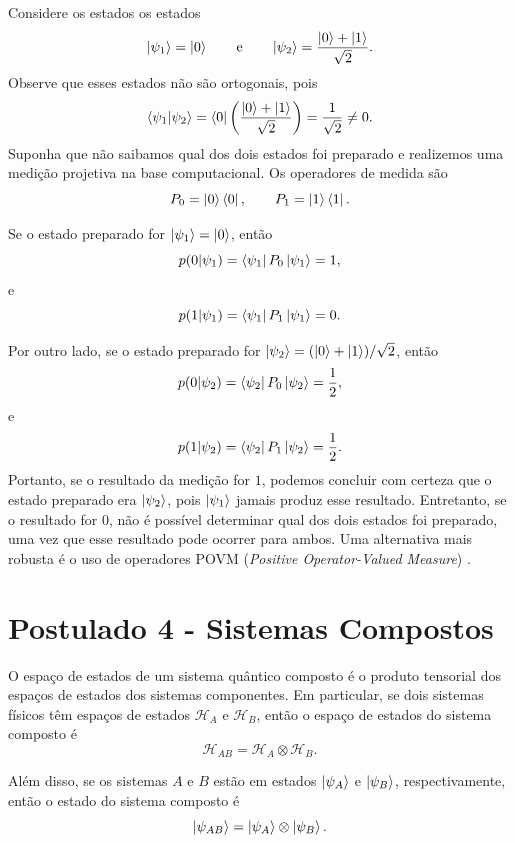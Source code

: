 \begin{example}\label{ex:nproj}
Considere os estados os estados
$$
    \ket{\psi_1}=\ket{0}
    \qquad\text{e}\qquad
    \ket{\psi_2}=\frac{\ket{0}+\ket{1}}{\sqrt{2}}.
$$
Observe que esses estados não são ortogonais, pois
$$
    \braket{\psi_1|\psi_2}
    =
    \bra{0}
    \left(
        \frac{\ket{0}+\ket{1}}{\sqrt{2}}
    \right)
    =
    \frac{1}{\sqrt{2}}
    \neq 0.
$$
Suponha que não saibamos qual dos dois estados foi preparado e
realizemos uma medição projetiva na base computacional. Os operadores
de medida são
$$
    P_0=\ket{0}\bra{0},
    \qquad
    P_1=\ket{1}\bra{1}.
$$

Se o estado preparado for $\ket{\psi_1}=\ket{0}$, então
$$
    p(0|\psi_1)
    =
    \bra{\psi_1}P_0\ket{\psi_1}
    =1,
$$
e
$$
    p(1|\psi_1)
    =
    \bra{\psi_1}P_1\ket{\psi_1}
    =0.
$$

Por outro lado, se o estado preparado for $\ket{\psi_2}=(\ket{0}+\ket{1})/\sqrt{2}$, então
$$
    p(0|\psi_2)
    =
    \bra{\psi_2}P_0\ket{\psi_2}
    =
    \frac{1}{2},
$$
e
$$
    p(1|\psi_2)
    =
    \bra{\psi_2}P_1\ket{\psi_2}
    =
    \frac{1}{2}.
$$
Portanto, se o resultado da medição for $1$, podemos concluir com
certeza que o estado preparado era $\ket{\psi_2}$, pois
$\ket{\psi_1}$ jamais produz esse resultado. Entretanto, se o
resultado for $0$, não é possível determinar qual dos dois estados
foi preparado, uma vez que esse resultado pode ocorrer para ambos. Uma alternativa mais robusta é o uso de operadores POVM (\textit{Positive Operator-Valued Measure}) \cite[p.~92]{nielsen2010quantum}.
\end{example}

\section{Postulado 4 - Sistemas Compostos}

O espaço de estados de um sistema quântico composto é o produto tensorial dos
espaços de estados dos sistemas componentes. Em particular, se dois sistemas
físicos têm espaços de estados $\mathcal{H}_A$ e $\mathcal{H}_B$, então o espaço de
estados do sistema composto é
\begin{equation}
\mathcal{H}_{AB} = \mathcal{H}_A \otimes \mathcal{H}_B.
\end{equation}

Além disso, se os sistemas $A$ e $B$ estão em estados $\ket{\psi_A}$ e $\ket{\psi_B}$,
respectivamente, então o estado do sistema composto é
\begin{equation}
\ket{\psi_{AB}} = \ket{\psi_A} \otimes \ket{\psi_B}.
\end{equation}

